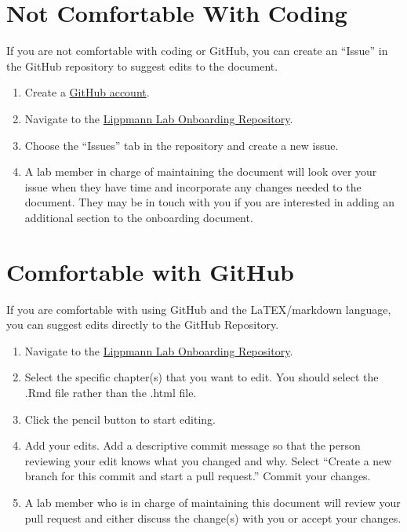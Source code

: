 \documentclass[
]{book}
\begin{document}
\hypertarget{not-comfortable-with-coding}{%
\section{Not Comfortable With Coding}\label{not-comfortable-with-coding}}

If you are not comfortable with coding or GitHub, you can create an ``Issue'' in the GitHub repository to suggest edits to the document.

\begin{enumerate}
\def\labelenumi{\arabic{enumi}.}
\item
  Create a \href{https://github.com/}{GitHub account}.
\item
  Navigate to the \href{https://github.com/LippmannLab/Lippmann-Lab-Onboarding}{Lippmann Lab Onboarding Repository}.
\item
  Choose the ``Issues'' tab in the repository and create a new issue.
\item
  A lab member in charge of maintaining the document will look over your issue when they have time and incorporate any changes needed to the document. They may be in touch with you if you are interested in adding an additional section to the onboarding document.
\end{enumerate}

\hypertarget{comfortable-with-github}{%
\section{Comfortable with GitHub}\label{comfortable-with-github}}

If you are comfortable with using GitHub and the LaTEX/markdown language, you can suggest edits directly to the GitHub Repository.

\begin{enumerate}
\def\labelenumi{\arabic{enumi}.}
\item
  Navigate to the \href{https://github.com/LippmannLab/Lippmann-Lab-Onboarding}{Lippmann Lab Onboarding Repository}.
\item
  Select the specific chapter(s) that you want to edit. You should select the .Rmd file rather than the .html file.
\item
  Click the pencil button to start editing.
\item
  Add your edits. Add a descriptive commit message so that the person reviewing your edit knows what you changed and why. Select ``Create a new branch for this commit and start a pull request.'' Commit your changes.
\item
  A lab member who is in charge of maintaining this document will review your pull request and either discuss the change(s) with you or accept your changes.
\end{enumerate}
\end{document}
